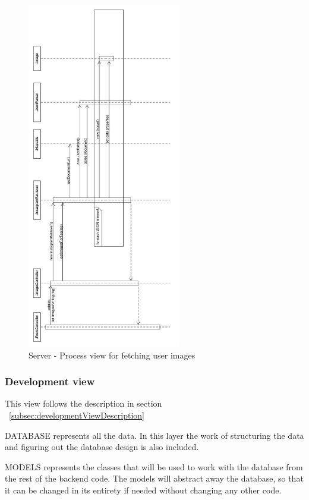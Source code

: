 \documentclass[11pt]{book}
\begin{document}
\begin{figure}[H]
      \centering
      \includegraphics[width=0.6\textwidth]{Figures/Architecture/Sequence/image.jpg}
      \caption{Server - Process view for fetching user images}
      \label{fig:arch_server_process_image}
\end{figure}

\subsubsection{Development view}
This view follows the description in section ~\ref{subsec:developmentViewDescription}

DATABASE represents all the data. In this layer the work of structuring the data and figuring out the database design is also included.

MODELS represents the classes that will be used to work with the database from the rest of the backend code. The models will abstract away the database, so that it can be changed in its entirety if needed without changing any other code.
\end{document}
